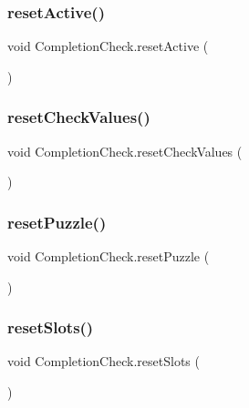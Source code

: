 \subsubsection{\texorpdfstring{reset\+Active()}{resetActive()}}
{\footnotesize\ttfamily void Completion\+Check.\+reset\+Active (\begin{DoxyParamCaption}{ }\end{DoxyParamCaption})}

\mbox{\label{class_completion_check_aca7af54ed862a4e68ea33ba918552526}} 
\subsubsection{\texorpdfstring{reset\+Check\+Values()}{resetCheckValues()}}
{\footnotesize\ttfamily void Completion\+Check.\+reset\+Check\+Values (\begin{DoxyParamCaption}{ }\end{DoxyParamCaption})}

\mbox{\label{class_completion_check_a98191957075533d151dc7698427e60ef}} 
\subsubsection{\texorpdfstring{reset\+Puzzle()}{resetPuzzle()}}
{\footnotesize\ttfamily void Completion\+Check.\+reset\+Puzzle (\begin{DoxyParamCaption}{ }\end{DoxyParamCaption})}

\mbox{\label{class_completion_check_ad8abae4b94bcebbbc02baa666f7edba1}} 
\subsubsection{\texorpdfstring{reset\+Slots()}{resetSlots()}}
{\footnotesize\ttfamily void Completion\+Check.\+reset\+Slots (\begin{DoxyParamCaption}{ }\end{DoxyParamCaption})}

